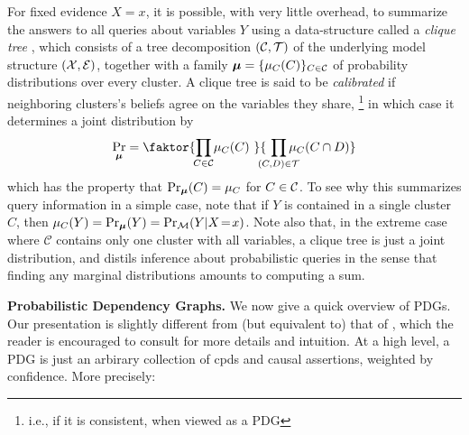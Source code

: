 \documentclass[twoside]{article}
\begin{document}
For fixed evidence
$X \!=\! x$, it is possible, with very
little overhead, to summarize the answers to all queries about variables
$Y$ using a data-structure called a \emph{clique tree}
\parencite[\S10]{koller2009probabilistic}, which consists of
a tree decomposition $(\cal C, T)$
of the underlying model structure $(\cal X, E)$, together with a family $\boldsymbol\mu = \{\mu_C(C)\}_{ C \in \mathcal C}$ of probability distributions over every cluster.
A clique tree is said to be \emph{calibrated} if neighboring clusters's beliefs agree on the variables they share,%
    \footnote{i.e., if it is consistent, when viewed as a PDG}
in which case it determines a joint distribution by
\begin{equation}
    \Pr_{\bmu} = \faktor
        {\prod_{\mathclap{C \in \cal C}} \mu_C(C)~}
        {~\prod_{\mathclap{(C,D) \in \cal T}} \mu_{C}(C \cap D)}
    \label{eq:cliquedist}
\end{equation}
which has the property that $\Pr_{\boldsymbol\mu}(C) = \mu_C$ for $C \in \cal C$.
To see why this summarizes query information in a simple case, note that if $Y$ is contained in a single cluster $C$, then $\mu_C(Y) = \Pr_{\boldsymbol\mu}(Y) = \Pr_{\cal M}(Y | X \!=\! x)$.
Note also that, in the extreme case where $\mathcal C$ contains only one cluster with all variables, a clique tree is just a joint distribution, and distils inference about probabilistic queries in the sense that finding any marginal distributions amounts to computing a sum.

\textbf{Probabilistic Dependency Graphs.}
We now give a quick overview of PDGs. Our presentation is slightly
different from (but equivalent to) that of
\textcite{pdg-aaai}, which
the reader is encouraged to consult for more details and intuition.
At a high level, a PDG
is just an arbirary collection of cpds and causal assertions,
    weighted by confidence. More precisely:
\end{document}
